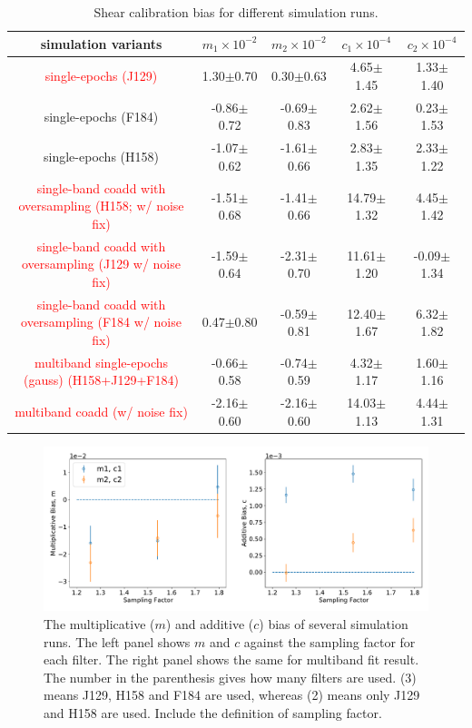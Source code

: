 \documentclass[fleqn,usenatbib]{mnras}
\begin{document}
\begin{table}
	\centering
	\label{tab:bias_summary}
	\begin{tabular}[scale=1.4]{ c|c|c|c|c } 
		\hline
		simulation variants & $m_{1}\times10^{-2}$ & $m_{2}\times10^{-2}$ & $c_{1}\times10^{-4}$ & $c_{2}\times10^{-4}$\\
		\hline
		\textcolor{red}{single-epochs (J129)} & 1.30$\pm$0.70 & 0.30$\pm$0.63 & 4.65$\pm$1.45 & 1.33$\pm$1.40\\
		single-epochs (F184) & -0.86$\pm$0.72 & -0.69$\pm$0.83 & 2.62$\pm$1.56 & 0.23$\pm$1.53\\
		single-epochs (H158) & -1.07$\pm$0.62 & -1.61$\pm$0.66 & 2.83$\pm$1.35 & 2.33$\pm$1.22\\
		\hline
		\textcolor{red}{single-band coadd with oversampling (H158; w/ noise fix)} & -1.51$\pm$0.68 & -1.41$\pm$0.66 & 14.79$\pm$1.32 & 4.45$\pm$1.42\\
		\textcolor{red}{single-band coadd with oversampling (J129 w/ noise fix)} & -1.59$\pm$0.64 & -2.31$\pm$0.70 & 11.61$\pm$1.20 & -0.09$\pm$1.34\\
		\textcolor{red}{single-band coadd with oversampling (F184 w/ noise fix)} & 0.47$\pm$0.80 & -0.59$\pm$0.81 & 12.40$\pm$1.67 & 6.32$\pm$1.82\\
		\hline
		\textcolor{red}{multiband single-epochs (gauss) (H158+J129+F184)} & -0.66$\pm$0.58 & -0.74$\pm$0.59 & 4.32$\pm$1.17 & 1.60$\pm$1.16 \\
		\textcolor{red}{multiband coadd (w/ noise fix)} & -2.16$\pm$0.60 & -2.16$\pm$0.60 & 14.03$\pm$1.13 & 4.44$\pm$1.31\\
		
		\hline
	\end{tabular}
	\caption{Shear calibration bias for different simulation runs.}
	\label{tab:result}
\end{table}

\begin{figure}
	\includegraphics[scale=0.5]{final_result.pdf}
    \caption{The multiplicative ($m$) and additive ($c$) bias of several simulation runs. The left panel shows $m$ and $c$ against the sampling factor for each filter. The right panel shows the same for multiband fit result. The number in the parenthesis gives how many filters are used. (3) means J129, H158 and F184 are used, whereas (2) means only J129 and H158 are used. Include the definition of sampling factor. }
    \label{fig:final_result}
\end{figure}
\end{document}
